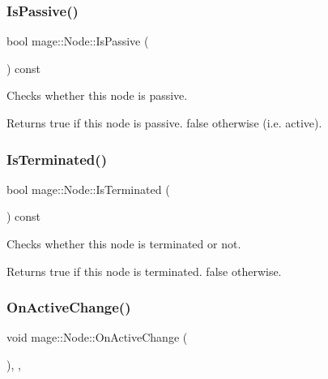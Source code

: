\subsubsection{\texorpdfstring{Is\+Passive()}{IsPassive()}}
{\footnotesize\ttfamily bool mage\+::\+Node\+::\+Is\+Passive (\begin{DoxyParamCaption}{ }\end{DoxyParamCaption}) const\hspace{0.3cm}{\ttfamily [noexcept]}}

Checks whether this node is passive.

\begin{DoxyReturn}{Returns}
{\ttfamily true} if this node is passive. {\ttfamily false} otherwise (i.\+e. active). 
\end{DoxyReturn}
\hypertarget{classmage_1_1_node_af669e446591ecb2d56b44769ba432172}{}\label{classmage_1_1_node_af669e446591ecb2d56b44769ba432172} 
\subsubsection{\texorpdfstring{Is\+Terminated()}{IsTerminated()}}
{\footnotesize\ttfamily bool mage\+::\+Node\+::\+Is\+Terminated (\begin{DoxyParamCaption}{ }\end{DoxyParamCaption}) const\hspace{0.3cm}{\ttfamily [noexcept]}}

Checks whether this node is terminated or not.

\begin{DoxyReturn}{Returns}
{\ttfamily true} if this node is terminated. {\ttfamily false} otherwise. 
\end{DoxyReturn}
\hypertarget{classmage_1_1_node_a65c1c55801a8e1d5354ac79d0c2fca6e}{}\label{classmage_1_1_node_a65c1c55801a8e1d5354ac79d0c2fca6e} 
\subsubsection{\texorpdfstring{On\+Active\+Change()}{OnActiveChange()}}
{\footnotesize\ttfamily void mage\+::\+Node\+::\+On\+Active\+Change (\begin{DoxyParamCaption}{ }\end{DoxyParamCaption})\hspace{0.3cm}{\ttfamily [private]}, {\ttfamily [virtual]}, {\ttfamily [noexcept]}}

